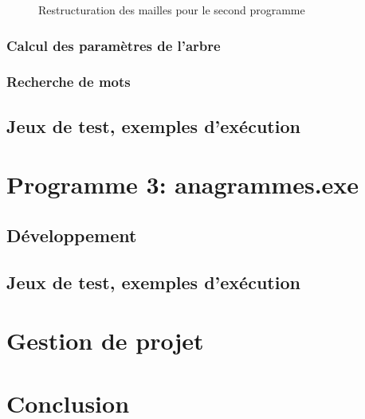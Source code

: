 \documentclass{article} %
\begin{document}
\begin{figure}[H]
  \begin{center}
  \end{center}
  \caption{Restructuration des mailles pour le second programme}
  \label{fig:restruc_pro2}
\end{figure}


\subsubsection{Calcul des paramètres de l'arbre}
\subsubsection{Recherche de mots}

\subsection{Jeux de test, exemples d'exécution}



\section{Programme 3: anagrammes.exe}
\subsection{Développement}
\subsection{Jeux de test, exemples d'exécution}



\section{Gestion de projet}
\section{Conclusion}



\nocite{*}



\end{document}
